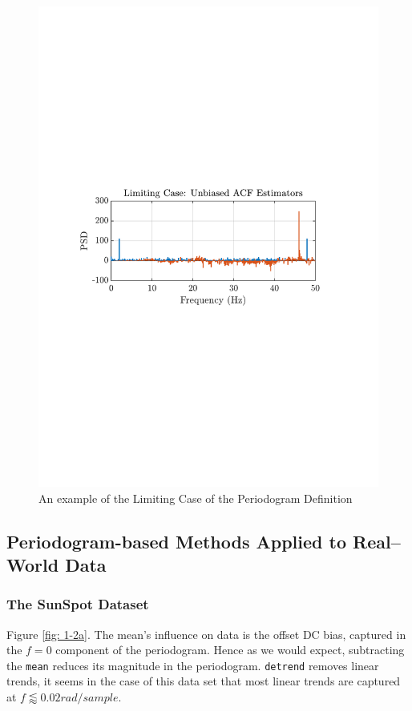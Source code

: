 \documentclass[12pt]{article}
\begin{document}
	\begin{figure}[H]
		\centering
		\includegraphics[trim={2.2cm 11.2cm 3.15cm  11.2cm}, clip, width=\textwidth]{../MATLAB/figures/q1_1b_fig01.pdf} 
		\captionsetup{justification=centering}
		\caption{An example of the Limiting Case of the Periodogram Definition}
		\label{fig: 1-1b}
	\end{figure}
	
	
	\subsection{Periodogram-based Methods Applied to Real–World Data} \label{sec: 1-2-PSD-real-world}
	\subsubsection{The SunSpot Dataset}
	Figure \ref{fig: 1-2a}. The mean's influence on data is the offset DC bias, captured in the $f=0$ component of the periodogram. Hence as we would expect, subtracting the \texttt{mean} reduces its magnitude in the periodogram. \texttt{detrend} removes linear trends, it seems in the case of this data set that most linear trends are captured at $f\lessapprox 0.02 rad/sample$. \\
	
\end{document}
